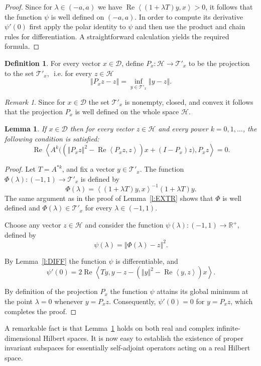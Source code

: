 \documentclass{tran-l}
\newtheorem{lem}[thm]{Lemma}
\theoremstyle{definition}
\newtheorem{defn}[thm]{Definition}
\theoremstyle{remark}
\newtheorem{rem}[thm]{Remark}
\numberwithin{equation}{subsection}
\DeclareMathOperator{\RE}{Re}
\newcommand{\To}{\longrightarrow}
\newcommand{\h}{\mathcal{H}}
\newcommand{\Real}{\mathbb{R}}
\newcommand{\RPlus}{\Real^{+}}
\newcommand{\EssD}{\mathcal{D}}
\newcommand{\States}{\mathcal{T}}
\newcommand{\seq}[1]{\left<#1\right>}
\newcommand{\norm}[1]{\left\Vert#1\right\Vert}
\begin{document}
\begin{proof}
Since for $\lambda\in(-a,a)$ we have $\RE\seq{(1+\lambda T)y, x}>0$, it follows that the function $\psi$ is well defined on $(-a,a)$. In order to compute its derivative $\psi'(0)$ first apply the polar identity to $\psi$ and then use the product and chain rules for differentiation. A straightforward calculation yields the required formula.
\end{proof}

\begin{defn}
For every vector $x\in\EssD$, define $P_x\colon\h\To\States'_x$ to be the projection to the set $\States'_x$, \,\,i.e. for every $z\in\h$
\[ \norm{P_x z - z} = \inf_{y\in\States'_x} \norm{y-z}. \]
\end{defn}

\begin{rem}
Since for $x\in\EssD$ the set $\States'_x$ is nonempty, closed, and convex it follows that the projection $P_x$ is well defined on the whole space $\h$.
\end{rem}

\begin{lem}\label{l:REIS}
If $x\in\EssD$ then for every vector $z\in\h$ and every power $k=0,1,\ldots$, the following condition is satisfied:
\[ \RE\seq{A^k\big((\norm{P_x z}^2 - \RE\seq{P_x z,z})x + (I-P_x)z\big),
      P_x z} = 0. \]
\end{lem}

\begin{proof}
Let $T=A^{*k}$, and fix a vector $y\in\States'_x$. The function $\Phi(\lambda)\colon(-1,1)\To\States'_x$ is defined by
\[ \Phi(\lambda) = \seq{(1+\lambda T)y, x}^{-1} (1+\lambda T)y. \]
The same argument as in the proof of Lemma~\ref{l:EXTR} shows that $\Phi$ is well defined and $\Phi(\lambda)\in\States'_x$ for every $\lambda\in(-1,1)$.

Choose any vector $z\in\h$ and consider the function $\psi(\lambda)\colon(-1,1)\To\RPlus$, defined by
\[ \psi(\lambda)=\norm{\Phi(\lambda) - z}^2. \]

By Lemma~\ref{l:DIFF} the function $\psi$ is differentiable, and
\[ \psi'(0) = 2\RE\seq{T y, y - z - (\norm{y}^2-\RE\seq{y,z}) x}. \]

By definition of the projection $P_x$ the function $\psi$ attains its global minimum at the point $\lambda=0$ whenever $y=P_x z$. Consequently, $\psi'(0)=0$ for $y=P_x z$, which completes the proof.
\end{proof}

A remarkable fact is that Lemma~\ref{l:REIS} holds on both real and complex infinite-dimensional Hilbert spaces. It is now easy to establish the existence of proper invariant subspaces for essentially self-adjoint operators acting on a real Hilbert space.
\end{document}
